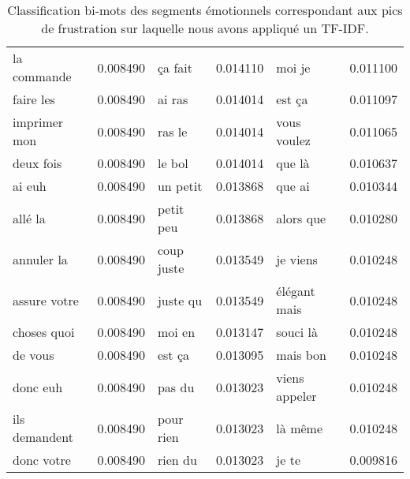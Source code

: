 \begin{table}[]
\begin{tabular}{|l l|l l|l l|}
 la commande &0.008490	& ça fait &0.014110	&moi je &0.011100\\
 faire les &0.008490	&ai ras &0.014014	&est ça &0.011097\\
imprimer mon &0.008490	&ras le &0.014014	& vous voulez &0.011065\\
 deux fois &0.008490	&le bol &0.014014	&que là &0.010637\\
ai euh &0.008490	&un petit &0.013868	&que ai &0.010344\\
 allé la &0.008490	& petit peu &0.013868	& alors que &0.010280\\
annuler la &0.008490	&coup juste &0.013549	&je viens &0.010248\\
assure votre &0.008490	&juste qu &0.013549	&élégant mais &0.010248\\
 choses quoi &0.008490	&moi en &0.013147	&souci là &0.010248\\
 de vous &0.008490	&est ça &0.013095	&mais bon &0.010248\\
donc euh &0.008490	&pas du &0.013023	& viens appeler &0.010248\\
 ils demandent &0.008490	& pour rien &0.013023	& là même &0.010248\\
donc votre &0.008490	& rien du &0.013023	& je te &0.009816\\
 \hline
\end{tabular}
\caption{Classification bi-mots des segments émotionnels correspondant aux pics de frustration sur laquelle nous avons appliqué un TF-IDF.}
\label{tab:kmeans}
\end{table}
